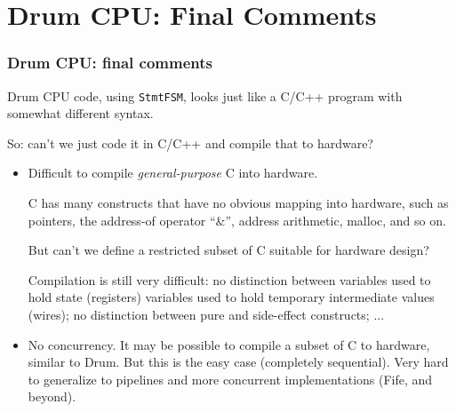 \section{Drum CPU: Final Comments}

\begin{frame}[fragile]
\frametitle{Drum CPU: final comments}

\footnotesize

Drum CPU code, using {\tt StmtFSM}, looks just like a C/C++ program
with somewhat different syntax.

\vspace{2ex}

So: can't we just code it in C/C++ and compile that to hardware?

\vspace{2ex}

\begin{itemize}
        
 \item Difficult to compile \emph{general-purpose} C into hardware.

       C has many constructs that have no obvious mapping into
       hardware, such as pointers, the address-of operator ``\&'',
       address arithmetic, malloc, and so on.

       But can’t we define a restricted subset of C suitable for
       hardware design?

       Compilation is still very difficult: no distinction between
       variables used to hold state (registers) {\vs} variables used
       to hold temporary intermediate values (wires); no distinction
       between pure and side-effect constructs; ...

 \item No concurrency.  It may be possible to compile a subset of C to
       hardware, similar to Drum.  But this is the easy case
       (completely sequential).  Very hard to generalize to pipelines
       and more concurrent implementations (Fife, and beyond).

\end{itemize}

\end{frame}






